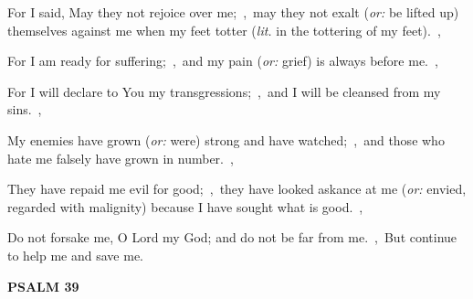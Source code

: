 \documentclass[12pt,twoside,a5paper]{article}
\newcommand{\psalm}[1]{\textbf{PSALM {#1}}\nopagebreak}
\newcommand{\translationoption}[1]{\emph{or:} #1}
\newcommand{\translationliteral}[1]{\emph{lit.} #1}
\begin{document}
\begin{normalparskip}
  For I said, May they not rejoice over me;~\sep\ may they not exalt (\translationoption{be lifted up}) themselves against me when my feet totter (\translationliteral{in the tottering of my feet}).~\sep

  For I am ready for suffering;~\sep\ and my pain (\translationoption{grief}) is always before me.~\sep

  For I will declare to You my transgressions;~\sep\ and I will be cleansed from my sins.~\sep

  My enemies have grown (\translationoption{were}) strong and have watched;~\sep\ and those who hate me falsely have grown in number.~\sep

  They have repaid me evil for good;~\sep\ they have looked askance at me (\translationoption{envied, regarded with malignity}) because I have sought what is good.~\sep

  Do not forsake me, O Lord my God; and do not be far from me.~\sep\ But continue to help me and save me.
\end{normalparskip}

\psalm{39}
\end{document}
